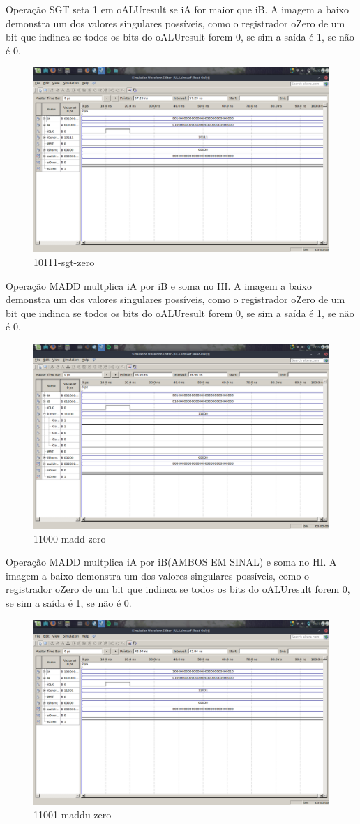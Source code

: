 \documentclass[12pt]{article}
\begin{document}
Operação SGT seta 1 em oALUresult se iA for maior que iB.
A imagem a baixo demonstra um dos valores singulares possíveis, como o registrador oZero de um bit que indinca se todos os bits do oALUresult forem 0, se sim a saída é 1, se não é 0.
\begin{figure}[H]
	\centering
	\includegraphics[width=.8\textwidth]{10111-sgt-zero.png}
	\caption{10111-sgt-zero}
	\label{10111-sgt-zero}
\end{figure}
Operação MADD multplica iA por iB e soma no HI.
A imagem a baixo demonstra um dos valores singulares possíveis, como o registrador oZero de um bit que indinca se todos os bits do oALUresult forem 0, se sim a saída é 1, se não é 0.
\begin{figure}[H]
	\centering
	\includegraphics[width=.8\textwidth]{11000-madd-zero.png}
	\caption{11000-madd-zero}
	\label{fig:11000-madd-zero}
\end{figure}
Operação MADD multplica iA por iB(AMBOS EM SINAL) e soma no HI.
A imagem a baixo demonstra um dos valores singulares possíveis, como o registrador oZero de um bit que indinca se todos os bits do oALUresult forem 0, se sim a saída é 1, se não é 0.
\begin{figure}[H]
	\centering
	\includegraphics[width=.8\textwidth]{11001-maddu-zero.png}
	\caption{11001-maddu-zero}
	\label{fig:11001-maddu-zero}
\end{figure}
\end{document}
